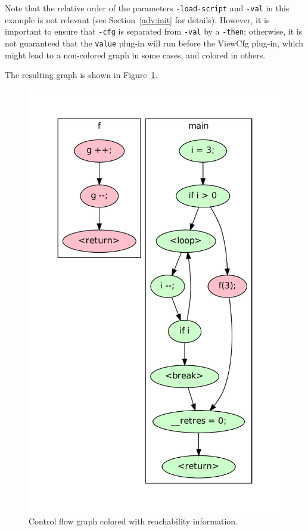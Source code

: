 Note that the relative order of the parameters \texttt{-load-script} and
\texttt{-val} in this example is not relevant
(see Section~\ref{adv:init} for details).
However, it is important to ensure that \texttt{-cfg} is separated from
\texttt{-val} by a \texttt{-then}; otherwise, it is not guaranteed that
the \texttt{value} plug-in will run before the ViewCfg plug-in, which might
lead to a non-colored graph in some cases, and colored in others.

The resulting graph is shown in Figure~\ref{fig:tut:coloredcfg}.

\begin{figure}[htbp]
  \centering
  \begin{minipage}[h]{0.45\linewidth}
  \end{minipage}%
  \begin{minipage}[h]{0.4\linewidth}
    \includegraphics[width=\textwidth]{./tutorial/viewcfg/pdfs/cfg_colored.pdf}
  \end{minipage}
  \caption{Control flow graph colored with reachability information.}
  \label{fig:tut:coloredcfg}
\end{figure}

